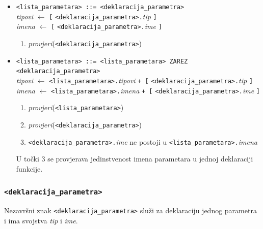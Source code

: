 \documentclass[times, 12pt, utf8]{book}
\begin{document}
\begin{itemize}

\item
\verb|<lista_parametara> ::= <deklaracija_parametra>|\\
\emph{tipovi} \(\leftarrow\) \verb|[| \verb|<deklaracija_parametra>.|\emph{tip} \verb|]|\\
\emph{imena} \(\leftarrow\) \verb|[| \verb|<deklaracija_parametra>.|\emph{ime} \verb|]|
\begin{enumerate}
\item
\emph{provjeri}(\verb|<deklaracija_parametra>|)
\end{enumerate}

\item
\verb|<lista_parametara> ::= <lista_parametara> ZAREZ <deklaracija_parametra>|\\
\emph{tipovi} \(\leftarrow\) \verb|<lista_parametara>.|\emph{tipovi} \verb|+ [| \verb|<deklaracija_parametra>.|\emph{tip} \verb|]|\\
\emph{imena} \(\leftarrow\) \verb|<lista_parametara>.|\emph{imena} \verb|+ [| \verb|<deklaracija_parametra>.|\emph{ime} \verb|]|
\begin{enumerate}
\item
\emph{provjeri}(\verb|<lista_parametara>|)
\item
\emph{provjeri}(\verb|<deklaracija_parametra>|)
\item
\verb|<deklaracija_parametra>.|\emph{ime} ne postoji u \verb|<lista_parametara>.|\emph{imena}
\end{enumerate}

U točki 3 se provjerava jedinstvenost imena parametara u jednoj deklaraciji funkcije.

\end{itemize}

\subsubsection{\texttt{<deklaracija\_parametra>}}

Nezavršni znak \verb|<deklaracija_parametra>| služi za deklaraciju jednog parametra i ima svojstva \emph{tip} i \emph{ime}.
\end{document}
